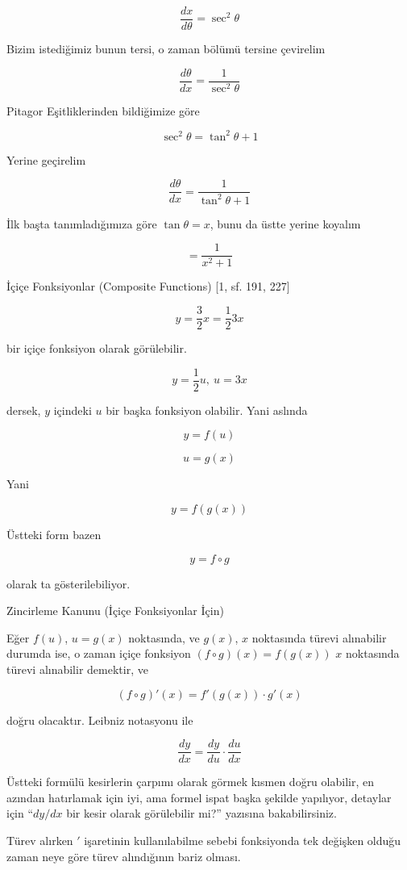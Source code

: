 \documentclass[12pt,fleqn]{article}\usepackage{../../common}
\begin{document}
$$ \frac{dx}{d\theta} = \sec^{2}\theta $$

Bizim istediğimiz bunun tersi, o zaman bölümü tersine çevirelim

$$ \frac{d\theta}{dx} = \frac{1}{\sec^{2}\theta} $$

Pitagor Eşitliklerinden bildiğimize göre

$$ \sec^{2}\theta = \tan^{2}\theta + 1 $$

Yerine geçirelim

$$ \frac{d\theta}{dx} = \frac{1}{\tan^{2}\theta + 1} $$

İlk başta tanımladığımıza göre $\tan\theta = x$, bunu da üstte yerine
koyalım

$$  = \frac{1}{x^2 + 1} $$

\newpage

İçiçe Fonksiyonlar (Composite Functions) [1, sf. 191, 227]

$$ y = \frac{3}{2}x = \frac{1}{2}3x $$

bir içiçe fonksiyon olarak görülebilir. 

$$ y = \frac{1}{2}u, \ u=3x $$

dersek, $y$ içindeki $u$ bir başka fonksiyon olabilir. Yani aslında 

$$ y = f(u) $$

$$ u = g(x) $$

Yani

$$ y = f(g(x)) $$

Üstteki form bazen 

$$ y = f \circ g $$

olarak ta gösterilebiliyor. 

\newpage

Zincirleme Kanunu (İçiçe Fonksiyonlar İçin)

Eğer $f(u)$, $u=g(x)$ noktasında, ve $g(x)$, $x$ noktasında türevi
alınabilir durumda ise, o zaman içiçe fonksiyon $(f \circ g)(x) = f(g(x))$
$x$ noktasında türevi alınabilir demektir, ve

$$ (f \circ g)'(x) = f'(g(x)) \cdot g'(x) $$

doğru olacaktır. Leibniz notasyonu ile 

$$ \frac{ dy}{dx} = \frac{ dy}{du} \cdot \frac{ du}{dx} $$

Üstteki formülü kesirlerin çarpımı olarak görmek kısmen doğru olabilir, en
azından hatırlamak için iyi, ama formel ispat başka şekilde yapılıyor,
detaylar için ``$dy/dx$ bir kesir olarak görülebilir mi?'' yazısına
bakabilirsiniz.

Türev alırken $'$ işaretinin kullanılabilme sebebi fonksiyonda tek değişken
olduğu zaman neye göre türev alındığının bariz olması.
\end{document}
